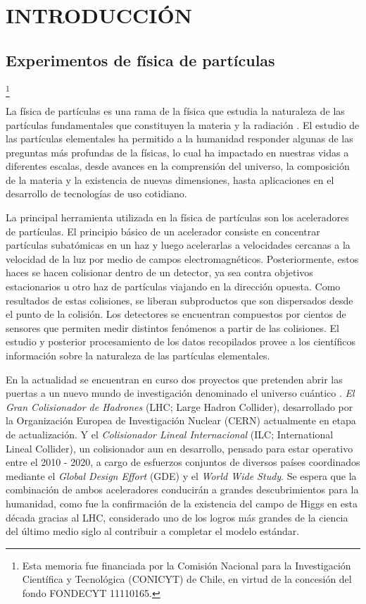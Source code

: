 \newcommand\blfootnote[1]{%
  \begingroup
  \renewcommand\thefootnote{}\footnote{#1}%
  \addtocounter{footnote}{-1}%
  \endgroup
}

\chapter{INTRODUCCIÓN}
\label{chapter:introduction}
\section{Experimentos de física de partículas}
\blfootnote{Esta memoria fue financiada por la Comisión Nacional para la Investigación Científica y Tecnológica (CONICYT) de Chile, en virtud de la concesión del fondo FONDECYT  11110165.} 

La física de partículas es una rama de la física que estudia la naturaleza de las partículas fundamentales que constituyen la materia y la radiación \citep{wiki}. El estudio de las partículas elementales ha permitido a la humanidad responder algunas de las preguntas más profundas de la físicas, lo cual ha impactado en nuestras vidas a diferentes escalas, desde avances en la comprensión del universo, la composición de la materia y la existencia de nuevas dimensiones, hasta aplicaciones en el desarrollo de tecnologías de uso cotidiano. 

La principal herramienta utilizada en la física de partículas son los aceleradores de partículas. El principio básico de un acelerador consiste en concentrar partículas subatómicas en un haz y luego acelerarlas a velocidades cercanas a la velocidad de la luz por medio de campos electromagnéticos. Posteriormente, estos haces se hacen colisionar dentro de un detector, ya sea contra objetivos estacionarios u otro haz de partículas viajando en la dirección opuesta.  Como resultados de estas colisiones, se liberan subproductos que son dispersados desde el punto de la colisión. Los detectores se encuentran compuestos por cientos de sensores que permiten medir distintos fenómenos a partir de las colisiones. El estudio y posterior procesamiento de los datos recopilados  provee a los científicos información sobre la naturaleza de las partículas elementales.

En la actualidad se encuentran en curso dos proyectos que pretenden abrir las puertas a un nuevo mundo de investigación denominado el universo cuántico \citep{ilc101}. \textit{El Gran Colisionador de Hadrones} (LHC; Large Hadron Collider), desarrollado por la Organización Europea de Investigación Nuclear (CERN) actualmente en etapa de actualización. Y el \textit{Colisionador Lineal Internacional} (ILC; International Lineal Collider), un colisionador aun en desarrollo, pensado para estar operativo entre el 2010 - 2020, a cargo de esfuerzos conjuntos de diversos países coordinados mediante el \textit{Global Design Effort} (GDE) y el \textit{World Wide Study}. Se espera que la combinación de ambos aceleradores conducirán a grandes descubrimientos para la humanidad, como fue la confirmación de la existencia del campo de Higgs en esta década gracias al LHC, considerado uno de los logros más grandes de la ciencia del último medio siglo al contribuir a completar el modelo estándar.

